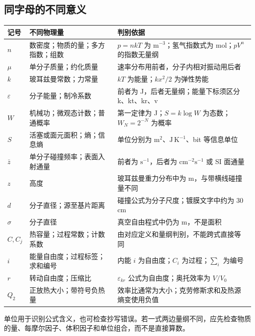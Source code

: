 \documentclass[UTF8,fontset=none,zihao=-4,a4paper]{ctexart}
\begin{document}
\subsection{同字母的不同意义}
\begin{longtable}{p{18mm}p{54mm}p{72mm}}
\toprule 记号 & 不同物理量 & 判别依据\\\midrule\endhead
$n$ & 数密度；物质的量；多方指数；组数 & $p=nkT$ 为 $\mathrm m^{-3}$；氢气指数式为 mol；$pV^n$ 的指数无量纲\\
$\mu$ & 单分子质量；约化质量 & 速率分布用前者，分子内相对振动用后者\\
$k$ & 玻耳兹曼常数；力常量 & $kT$ 为能量；$kx^2/2$ 为弹性势能\\
$\varepsilon$ & 分子能量；制冷系数 & 前者为 J，后者无量纲；能量下标须区分 k、kt、kr、v\\
$W$ & 机械功；微观态计数；普通概率 & 第一定律为 J；$S=k\log W$ 为态数；$W_N=2^{-N}$ 为概率\\
$S$ & 活塞或面元面积；熵；信息熵 & 单位分别为 $\mathrm m^2$、$\mathrm{J\,K^{-1}}$、bit 等信息单位\\
$\bar z$ & 单分子碰撞频率；表面入射通量 & 前者为 $\mathrm s^{-1}$，后者为 $\mathrm{cm^{-2}s^{-1}}$ 或 SI 面通量\\
$z$ & 高度 & 玻耳兹曼重力分布中为 m，与带横线碰撞量不同\\
$d$ & 分子直径；源至基片距离 & 碰撞公式为分子尺度；镀膜文字中约为 30 cm\\
$\sigma$ & 分子直径 & 真空自由程式中仍为 m，不是面积\\
$C,C_j$ & 热容量；过程常数；计数系数 & 由对应定义和量纲判别，不能跨式直接等同\\
$i$ & 能量自由度；过程标签；求和编号 & 内能 $i$ 为自由度；$C_i$ 为过程；$\sum_i$ 为编号\\
$r$ & 转动自由度；压缩比 & $\varepsilon_{kr}$ 公式为自由度；奥托效率为 $V/V_0$\\
$Q_2$ & 正放热大小；带符号负热量 & 效率比通常为大小；克劳修斯求和及热源熵变使用负值\\
\bottomrule\end{longtable}
单位用于识别公式含义，也可检查抄写错误。若一式两边量纲不同，应先检查物质的量、每摩尔因子、体积因子和单位组合，而不是直接算数。
\Needspace{230pt}
\end{document}
